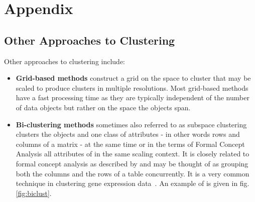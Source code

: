 \appendix
\renewcommand{\thesection}{\Alph{section}}
\chapter*{Appendix}


\section{Other Approaches to Clustering}\label{\positionnumber}
Other approaches to clustering include:
\begin{itemize}
    \item \textbf{Grid-based methods} construct a grid on the space to cluster that may be scaled to produce clusters in multiple resolutions. Most grid-based methods have a fast processing time as they are typically independent of the number of data objects but rather on the space the objects span.
    
    \item \textbf{Bi-clustering methods} sometimes also referred to as subspace clustering clusters the objects and one class of attributes - in other words rows and columns of a matrix - at the same time or in the terms of Formal Concept Analysis all attributes of in the same scaling context. It is closely related to formal concept analysis as described by\cite{ignatov2012concept} and may be thought of as grouping both the columns and the rows of a table concurrently. It is a very common technique in clustering gene expression data~\cite{PONTES2015163}. An example of is given in fig. \ref{fig:biclust}. 


\end{itemize}

